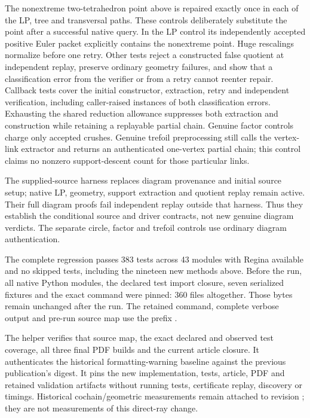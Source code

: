 The nonextreme two-tetrahedron point above is repaired exactly once in each
of the LP, tree and transversal paths.  These controls deliberately substitute
the point after a successful native query.  In the LP control its independently
accepted positive Euler packet explicitly contains the nonextreme point.
Huge rescalings normalize before one retry.  Other tests reject a constructed
false quotient at independent replay, preserve ordinary geometry failures,
and show that a classification error from the verifier or from a retry
cannot reenter repair.  Callback tests cover the initial constructor,
extraction, retry and independent verification, including caller-raised
instances of both classification errors.  Exhausting the shared reduction
allowance suppresses both extraction and construction while retaining a
replayable partial chain.  Genuine factor controls charge only accepted
crushes.  Genuine trefoil preprocessing still calls the vertex-link
extractor and returns an authenticated one-vertex partial chain; this
control claims no nonzero support-descent count for those particular links.

The supplied-source harness replaces diagram provenance and initial source
setup; native LP, geometry, support extraction and
quotient replay remain active.  Their full diagram proofs fail independent
replay outside that harness.  Thus they establish the conditional source
and driver contracts, not new genuine diagram verdicts.  The separate
circle, factor and trefoil controls use ordinary diagram authentication.


The complete regression passes 383 tests across 43 modules with Regina
available and no skipped tests, including the nineteen new methods above.
Before the run, all native Python modules, the declared test import closure,
seven serialized fixtures and the exact command were pinned: 360 files
altogether.  Those bytes remain unchanged after the run.  The retained
command, complete verbose output and pre-run source map use the prefix
.

The helper  verifies that source
map, the exact declared and observed test coverage, all three final PDF
builds and the current article closure.  It authenticates the historical
formatting-warning baseline against the previous publication's digest.
It pins the new implementation, tests, article, PDF and retained validation
artifacts without running tests, certificate replay, discovery or timings.
Historical cochain/geometric measurements remain attached to revision
; they are not measurements of this direct-ray change.
